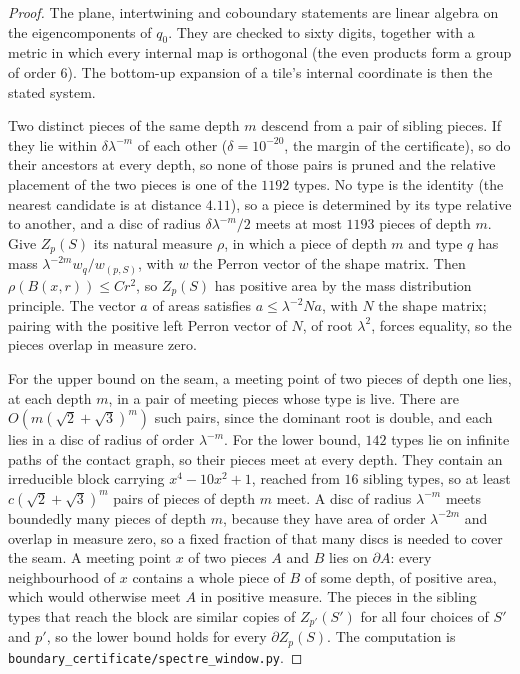 \documentclass[11pt]{article}
\theoremstyle{definition}
\theoremstyle{remark}
\newcommand{\lam}{\lambda}
\newcommand{\code}[1]{\texttt{#1}}
\begin{document}
\begin{proof}
The plane, intertwining and coboundary statements are linear algebra on the eigencomponents of $q_{0}$.  They are checked
to sixty digits, together with a metric in which every internal map is orthogonal (the even products form a group of
order $6$).  The bottom-up expansion of a tile's internal coordinate is then the stated system.

Two distinct pieces of the same depth $m$ descend from a pair of sibling pieces.  If they lie within $\delta\lam^{-m}$
of each other ($\delta=10^{-20}$, the margin of the certificate), so do their ancestors at every depth, so none of
those pairs is pruned and the relative placement of the two pieces is one of the $1192$ types.  No type is the
identity (the nearest candidate is at distance $4.11$), so a piece is determined by its type relative to another, and a
disc of radius $\delta\lam^{-m}/2$ meets at most $1193$ pieces of depth $m$.  Give $Z_{p}(S)$ its natural measure
$\rho$, in which a piece of depth $m$ and type $q$ has mass $\lam^{-2m}w_{q}/w_{(p,S)}$, with $w$ the Perron vector of
the shape matrix.  Then $\rho(B(x,r))\le Cr^{2}$, so $Z_{p}(S)$ has positive area by the mass distribution principle.
The vector $a$ of areas satisfies $a\le\lam^{-2}Na$, with $N$ the shape matrix; pairing with the positive left Perron
vector of $N$, of root $\lam^{2}$, forces equality, so the pieces overlap in measure zero.

For the upper bound on the seam, a meeting point of two pieces of depth one lies, at each depth $m$, in a pair of meeting
pieces whose type is live.  There are $O(m(\sqrt2+\sqrt3)^{m})$ such pairs, since the dominant root is double, and
each lies in a disc of radius of order $\lam^{-m}$.  For the lower bound, $142$ types lie on infinite paths of the
contact graph, so their pieces meet at every depth.  They contain an irreducible block carrying $x^{4}-10x^{2}+1$,
reached from $16$ sibling types, so at least $c(\sqrt2+\sqrt3)^{m}$ pairs of pieces of depth $m$ meet.  A disc of
radius $\lam^{-m}$ meets boundedly many pieces of depth $m$, because they have area of order $\lam^{-2m}$ and overlap
in measure zero, so a fixed fraction of that many discs is needed to cover the seam.  A meeting point $x$ of two pieces
$A$ and $B$ lies on $\partial A$: every neighbourhood of $x$ contains a whole piece of $B$ of some depth, of positive
area, which would otherwise meet $A$ in positive measure.  The pieces in the sibling types that reach the block are
similar copies of $Z_{p'}(S')$ for all four choices of $S'$ and $p'$, so the lower bound holds for every
$\partial Z_{p}(S)$.  The computation is \code{boundary\_certificate/spectre\_window.py}.
\end{proof}
\end{document}
